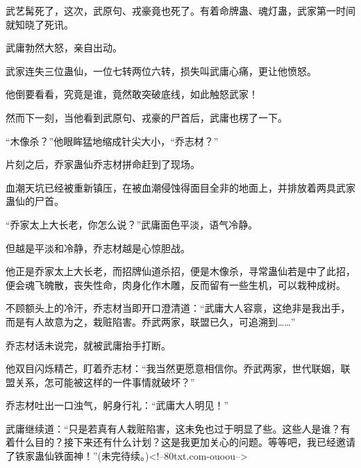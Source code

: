 \begin{this_body}
武艺髯死了，这次，武原句、戎豪竟也死了。有着命牌蛊、魂灯蛊，武家第一时间就知晓了死讯。

武庸勃然大怒，亲自出动。

武家连失三位蛊仙，一位七转两位六转，损失叫武庸心痛，更让他愤怒。

他倒要看看，究竟是谁，竟然敢突破底线，如此触怒武家！

然而下一刻，当他看到武原句、戎豪的尸首后，武庸也楞了一下。

“木像杀？”他眼眸猛地缩成针尖大小，“乔志材？”

片刻之后，乔家蛊仙乔志材拼命赶到了现场。

血潮天坑已经被重新镇压，在被血潮侵蚀得面目全非的地面上，并排放着两具武家蛊仙的尸首。

“乔家太上大长老，你怎么说？”武庸面色平淡，语气冷静。

但越是平淡和冷静，乔志材越是心惊胆战。

他正是乔家太上大长老，而招牌仙道杀招，便是木像杀，寻常蛊仙若是中了此招，便会魂飞魄散，丧失性命，肉身化作木雕，反而留有一些生机，可以栽种成树。

不顾额头上的冷汗，乔志材当即开口澄清道：“武庸大人容禀，这绝非是我出手，而是有人故意为之，栽赃陷害。乔武两家，联盟已久，可追溯到……”

乔志材话未说完，就被武庸抬手打断。

他双目闪烁精芒，盯着乔志材：“我当然更愿意相信你。乔武两家，世代联姻，联盟关系，怎可能被这样的一件事情就破坏？”

乔志材吐出一口浊气，躬身行礼：“武庸大人明见！”

武庸继续道：“只是若真有人栽赃陷害，这未免也过于明显了些。这些人是谁？有着什么目的？接下来还有什么计划？这是我更加关心的问题。等等吧，我已经邀请了铁家蛊仙铁面神！”(未完待续。)<!--80txt.com-ouoou-->

\end{this_body}

